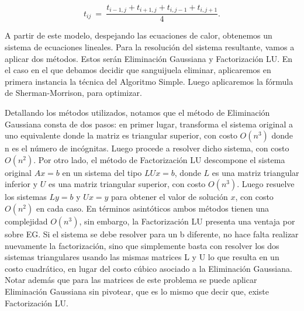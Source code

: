 \begin{equation}
t_{ij} \ =\ \frac{ t_{i-1,j} + t_{i+1,j} + t_{i,j-1} + t_{i,j+1}}{4}.\label{eq:calordd}
\end{equation}



A partir de este modelo, despejando las ecuaciones de calor, obtenemos un sistema de ecuaciones lineales. Para la resolución del sistema resultante, vamos a aplicar dos métodos. Estos serán Eliminación Gaussiana y Factorización LU. En el caso en el que debamos decidir que sanguijuela eliminar, aplicaremos en primera instancia la técnica del Algoritmo Simple. Luego aplicaremos la fórmula de Sherman-Morrison, para optimizar. 

Detallando los métodos utilizados, notamos que el método de Eliminación Gaussiana consta de dos pasos: en primer lugar, transforma el sistema original a uno equivalente donde la matriz es triangular superior, con costo $O(n^3)$ donde n es el número de incógnitas. Luego procede a resolver dicho sistema, con costo $O(n^2)$. Por otro lado, el método de Factorización LU descompone el sistema original
$Ax = b$ en un sistema del tipo $LUx = b$, donde $L$ es una matriz triangular inferior y $U$ es una matriz triangular superior, con costo $O(n^3)$. Luego resuelve los sistemas $Ly = b$ y $Ux = y$ para obtener el valor de solución $x$, con costo $O(n^2)$ en cada caso. En términos asintóticos ambos métodos tienen una complejidad $O(n^3)$, sin embargo, la Factorización LU presenta una ventaja por sobre EG. Si el sistema se debe resolver para un b diferente, no hace falta realizar nuevamente la factorización, sino que simplemente basta con resolver los dos sistemas triangulares usando las mismas matrices L y U lo que resulta en un costo cuadrático, en lugar del costo cúbico asociado a la Eliminación Gaussiana. \\

Notar además que para las matrices de este problema se puede aplicar Eliminación Gaussiana sin pivotear, que es lo mismo que decir que, existe Factorización LU.
